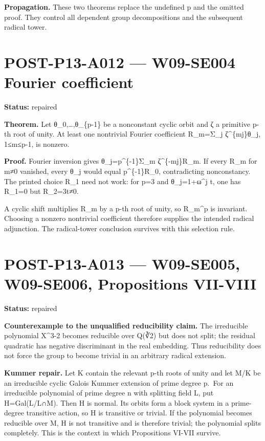 \documentclass[
  10pt,
  a4paper,
]{scrreprt}
\begin{document}
\textbf{Propagation.} These two theorems replace the undefined p and the
omitted proof. They control all dependent group decompositions and the
subsequent radical tower.

\section{POST-P13-A012 --- W09-SE004 Fourier
coefficient}\label{post-p13-a012-w09-se004-fourier-coefficient}

\textbf{Status:} repaired

\textbf{Theorem.} Let θ\_0,\ldots,θ\_\{p-1\} be a nonconstant cyclic
orbit and ζ a primitive p-th root of unity. At least one nontrivial
Fourier coefficient R\_m=Σ\_j ζ\^{}\{mj\}θ\_j, 1≤m≤p-1, is nonzero.

\textbf{Proof.} Fourier inversion gives θ\_j=p\^{}\{-1\}Σ\_m
ζ\^{}\{-mj\}R\_m. If every R\_m for m≠0 vanished, every θ\_j would equal
p\^{}\{-1\}R\_0, contradicting nonconstancy. The printed choice R\_1
need not work: for p=3 and θ\_j=1+ω\^{}j t, one has R\_1=0 but
R\_2=3t≠0.

A cyclic shift multiplies R\_m by a p-th root of unity, so R\_m\^{}p is
invariant. Choosing a nonzero nontrivial coefficient therefore supplies
the intended radical adjunction. The radical-tower conclusion survives
with this selection rule.

\section{POST-P13-A013 --- W09-SE005, W09-SE006, Propositions
VII-VIII}\label{post-p13-a013-w09-se005-w09-se006-propositions-vii-viii}

\textbf{Status:} repaired

\textbf{Counterexample to the unqualified reducibility claim.} The
irreducible polynomial X\^{}3-2 becomes reducible over Q(∛2) but does
not split; the residual quadratic has negative discriminant in the real
embedding. Thus reducibility does not force the group to become trivial
in an arbitrary radical extension.

\textbf{Kummer repair.} Let K contain the relevant p-th roots of unity
and let M/K be an irreducible cyclic Galois Kummer extension of prime
degree p.~For an irreducible polynomial of prime degree n with splitting
field L, put H=Gal(L/L∩M). Then H is normal. Its orbits form a block
system in a prime-degree transitive action, so H is transitive or
trivial. If the polynomial becomes reducible over M, H is not transitive
and is therefore trivial; the polynomial splits completely. This is the
context in which Propositions VI-VII survive.
\end{document}
